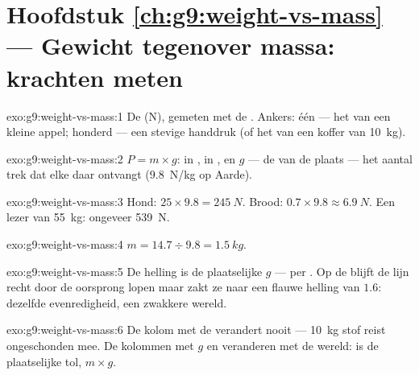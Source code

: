 \section*{Hoofdstuk \ref{ch:g9:weight-vs-mass} --- Gewicht tegenover massa: krachten meten}

\begin{solution}{exo:g9:weight-vs-mass:1}
De  (\unit{N}), gemeten met de
. Ankers: één  --- het
 van een kleine appel; honderd --- een stevige handdruk
(of het  van een koffer van \qty{10}{kg}).
\end{solution}

\begin{solution}{exo:g9:weight-vs-mass:2}
$P = m \times g$:  in ,
 in , en $g$ --- de
 van de plaats --- het aantal
 trek dat elke  daar ontvangt
(\qty{9.8}{N/kg} op Aarde).
\end{solution}

\begin{solution}{exo:g9:weight-vs-mass:3}
Hond: $25 \times 9.8 = \qty{245}{N}$. Brood: $0.7 \times 9.8 \approx
\qty{6.9}{N}$. Een lezer van \qty{55}{kg}: ongeveer \qty{539}{N}.
\end{solution}

\begin{solution}{exo:g9:weight-vs-mass:4}
$m = 14.7 \div 9.8 = \qty{1.5}{kg}$.
\end{solution}

\begin{solution}{exo:g9:weight-vs-mass:5}
De helling is de plaatselijke $g$ ---  per
. Op de  blijft de lijn recht door de
oorsprong lopen maar zakt ze naar een flauwe helling van $1.6$:
dezelfde evenredigheid, een zwakkere wereld.
\end{solution}

\begin{solution}{exo:g9:weight-vs-mass:6}
De kolom met de  verandert nooit --- \qty{10}{kg} stof reist
ongeschonden mee. De kolommen met $g$ en  veranderen met
de wereld:  is de plaatselijke tol, $m \times g$.
\end{solution}


